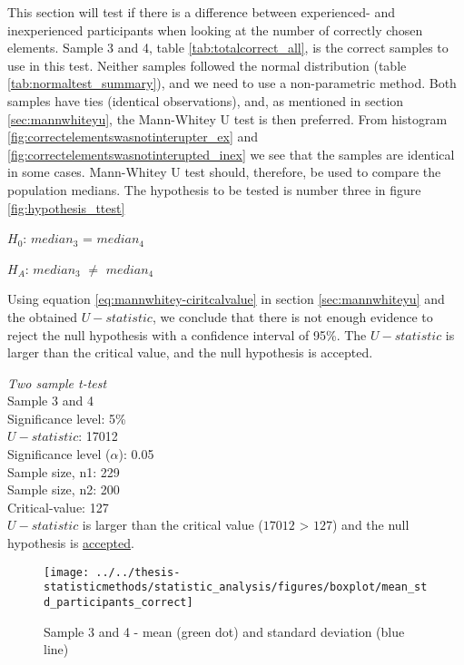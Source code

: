This section will test if there is a difference between experienced- and inexperienced participants when looking at the number of correctly chosen elements. Sample 3 and 4, table \ref{tab:totalcorrect_all}, is the correct samples to use in this test. Neither samples followed the normal distribution (table \ref{tab:normaltest_summary}), and we need to use a non-parametric method. Both samples have ties (identical observations), and, as mentioned in section \ref{sec:mannwhiteyu}, the Mann-Whitey U test is then preferred. From histogram \ref{fig:correctelementswasnotinterupter_ex} and \ref{fig:correctelementswasnotinterupted_inex} we see that the samples are identical in some cases. Mann-Whitey U test should, therefore, be used to compare the population medians. The hypothesis to be tested is number three in figure \ref{fig:hypothesis_ttest}\\[0.3cm]

\centerline{$H_{0}$: $median_3$ = $median_4$}
\centerline{$H_{A}$: $median_3$ $\neq$ $median_4$}

Using equation \ref{eq:mannwhitey-ciritcalvalue} in section \ref{sec:mannwhiteyu} and the obtained $U-statistic$, we conclude that there is not enough evidence to reject the null hypothesis with a confidence interval of 95\%. The $U-statistic$ is larger than the critical value, and the null hypothesis is accepted. 

 \begin{center}
	\begin{tcolorbox}[width=0.8\textwidth]
		\centering
		\textit{Two sample t-test}\\
		Sample 3 and 4\\
		Significance level: 5\%  \\[0.5cm]
		
		$U-statistic$: 17012 \\
		Significance level ($\alpha$): 0.05 \\
		Sample size, n1:  229\\
		Sample size, n2: 200\\
		Critical-value: 127 \\[0.2cm] %
		
		$U-statistic$ is larger than the critical value ($17012$ > $127$) and the null hypothesis is \underline{accepted}.\\[0.5cm]
	\end{tcolorbox} 
\end{center}

\begin{figure}[H]
	\centering
	\texttt{[image: ../../thesis-statisticmethods/statistic\_analysis/figures/boxplot/mean\_std\_participants\_correct]}
	\caption{Sample 3 and 4 - mean (green dot) and standard deviation (blue line)}
	\label{fig:meanstdparticipantscorrect}
\end{figure}

